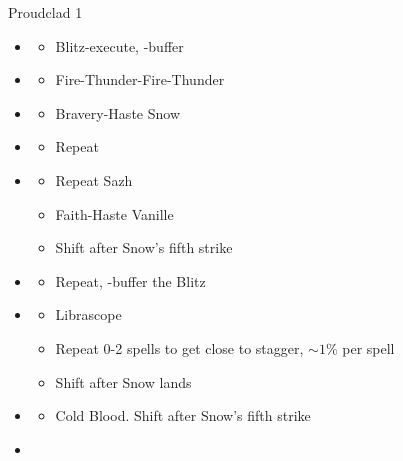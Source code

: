 \begin{battle}[1:31]{Proudclad 1}
	\begin{itemize}
		\item \second
		      \begin{itemize}
			      \item Blitz-execute, \rav-buffer
		      \end{itemize}
		\item \sixth
		      \begin{itemize}
			      \item Fire-Thunder-Fire-Thunder
		      \end{itemize}
		\item \fourth
		      \begin{itemize}
			      \item Bravery-Haste Snow
		      \end{itemize}
		\item \sixth
		      \begin{itemize}
			      \item Repeat
		      \end{itemize}
		\item \fourth
		      \begin{itemize}
			      \item Repeat Sazh
			      \item Faith-Haste Vanille
			      \item Shift after Snow's fifth strike
		      \end{itemize}
		\item \first
		      \begin{itemize}
			      \item Repeat, \rav-buffer the Blitz
		      \end{itemize}
		\item \fifth
		      \begin{itemize}
			      \item Librascope
			      \item Repeat 0-2 spells to get close to stagger, $\sim1\%$ per spell
			      \item Shift after Snow lands
		      \end{itemize}
		\item \sixth
		      \begin{itemize}
			      \item Cold Blood. Shift after Snow's fifth strike
		      \end{itemize}
		\item \fifth

\end{itemize}
\end{battle}
